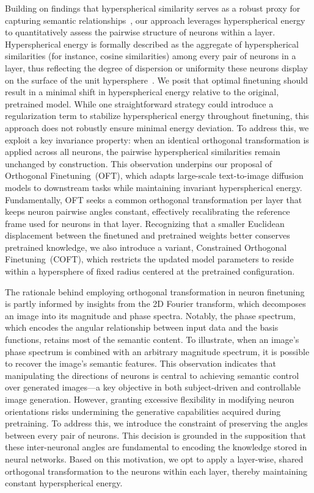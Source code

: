 Building on findings that hyperspherical similarity serves as a robust proxy for capturing semantic relationships~\cite{liu2017deep,liu2018decoupled,chen2020angular}, our approach leverages hyperspherical energy~\cite{liu2018learning} to quantitatively assess the pairwise structure of neurons within a layer. Hyperspherical energy is formally described as the aggregate of hyperspherical similarities (for instance, cosine similarities) among every pair of neurons in a layer, thus reflecting the degree of dispersion or uniformity these neurons display on the surface of the unit hypersphere~\cite{liu2021learning}. We posit that optimal finetuning should result in a minimal shift in hyperspherical energy relative to the original, pretrained model. While one straightforward strategy could introduce a regularization term to stabilize hyperspherical energy throughout finetuning, this approach does not robustly ensure minimal energy deviation. To address this, we exploit a key invariance property: when an identical orthogonal transformation is applied across all neurons, the pairwise hyperspherical similarities remain unchanged by construction. This observation underpins our proposal of Orthogonal Finetuning~(OFT), which adapts large-scale text-to-image diffusion models to downstream tasks while maintaining invariant hyperspherical energy. Fundamentally, OFT seeks a common orthogonal transformation per layer that keeps neuron pairwise angles constant, effectively recalibrating the reference frame used for neurons in that layer. Recognizing that a smaller Euclidean displacement between the finetuned and pretrained weights better conserves pretrained knowledge, we also introduce a variant, Constrained Orthogonal Finetuning~(COFT), which restricts the updated model parameters to reside within a hypersphere of fixed radius centered at the pretrained configuration.

The rationale behind employing orthogonal transformation in neuron finetuning is partly informed by insights from the 2D Fourier transform, which decomposes an image into its magnitude and phase spectra. Notably, the phase spectrum, which encodes the angular relationship between input data and the basis functions, retains most of the semantic content. To illustrate, when an image’s phase spectrum is combined with an arbitrary magnitude spectrum, it is possible to recover the image's semantic features. This observation indicates that manipulating the directions of neurons is central to achieving semantic control over generated images—a key objective in both subject-driven and controllable image generation. However, granting excessive flexibility in modifying neuron orientations risks undermining the generative capabilities acquired during pretraining. To address this, we introduce the constraint of preserving the angles between every pair of neurons. This decision is grounded in the supposition that these inter-neuronal angles are fundamental to encoding the knowledge stored in neural networks. Based on this motivation, we opt to apply a layer-wise, shared orthogonal transformation to the neurons within each layer, thereby maintaining constant hyperspherical energy.

